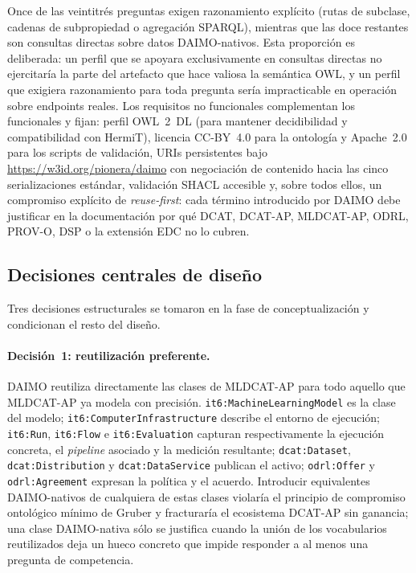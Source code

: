 \documentclass[Afour,sagev,times]{sagej}
\newcommand{\code}[1]{\texttt{#1}}
\begin{document}
Once de las veintitrés preguntas exigen razonamiento explícito (rutas de subclase, cadenas de subpropiedad o agregación SPARQL), mientras que las doce restantes son consultas directas sobre datos DAIMO-nativos. Esta proporción es deliberada: un perfil que se apoyara exclusivamente en consultas directas no ejercitaría la parte del artefacto que hace valiosa la semántica OWL, y un perfil que exigiera razonamiento para toda pregunta sería impracticable en operación sobre endpoints reales. Los requisitos no funcionales complementan los funcionales y fijan: perfil OWL~2~DL (para mantener decidibilidad y compatibilidad con HermiT), licencia CC-BY~4.0 para la ontología y Apache~2.0 para los scripts de validación, URIs persistentes bajo \url{https://w3id.org/pionera/daimo} con negociación de contenido hacia las cinco serializaciones estándar, validación SHACL accesible y, sobre todos ellos, un compromiso explícito de \emph{reuse-first}: cada término introducido por DAIMO debe justificar en la documentación por qué DCAT, DCAT-AP, MLDCAT-AP, ODRL, PROV-O, DSP o la extensión EDC no lo cubren.

\subsection{Decisiones centrales de diseño}\label{sec:method-design}

Tres decisiones estructurales se tomaron en la fase de conceptualización y condicionan el resto del diseño.

\paragraph{Decisión~1: reutilización preferente.} DAIMO reutiliza directamente las clases de MLDCAT-AP para todo aquello que MLDCAT-AP ya modela con precisión. \code{it6:MachineLearningModel} es la clase del modelo; \code{it6:ComputerInfrastructure} describe el entorno de ejecución; \code{it6:Run}, \code{it6:Flow} e \code{it6:Evaluation} capturan respectivamente la ejecución concreta, el \emph{pipeline} asociado y la medición resultante; \code{dcat:Dataset}, \code{dcat:Distribution} y \code{dcat:DataService} publican el activo; \code{odrl:Offer} y \code{odrl:Agreement} expresan la política y el acuerdo. Introducir equivalentes DAIMO-nativos de cualquiera de estas clases violaría el principio de compromiso ontológico mínimo de Gruber y fracturaría el ecosistema DCAT-AP sin ganancia; una clase DAIMO-nativa sólo se justifica cuando la unión de los vocabularios reutilizados deja un hueco concreto que impide responder a al menos una pregunta de competencia.
\end{document}
